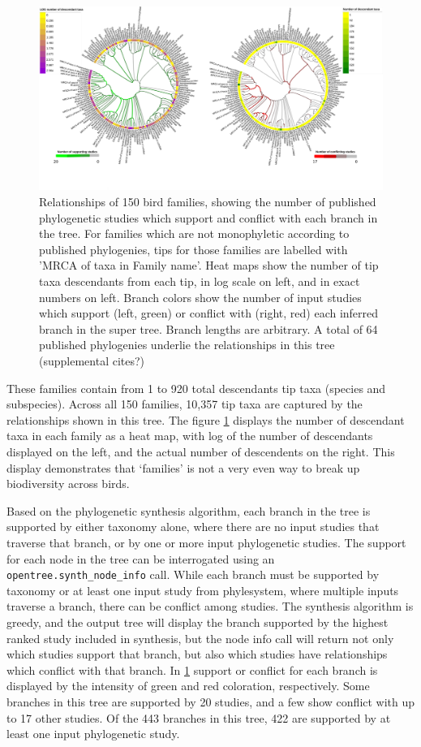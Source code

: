 \documentclass[oupdraft]{sysbio_sse}
\begin{document}
\begin{figure}[!p]
\centering\includegraphics[width=\textwidth]{bird_fam_fig}
\caption{Relationships of 150 bird families, showing the number of published phylogenetic studies which support and conflict with each branch in the tree. For families which are not monophyletic according to published phylogenies, tips for those families are labelled with 'MRCA of taxa in Family name'. Heat maps show the number of tip taxa descendants from each tip, in log scale on left, and in exact numbers on left. Branch colors show the number of input studies which support (left, green) or conflict with (right, red) each inferred branch in the super tree. Branch lengths are arbitrary. A total of 64 published phylogenies underlie the relationships in this tree (supplemental cites?)}
\label{birdfams}
\end{figure}

These families contain from 1 to 920 total descendants tip taxa (species and subspecies).
Across all 150 families, 10,357 tip taxa  are captured by the relationships shown in this tree.
The figure \ref{birdfams} displays the number of descendant taxa in each family as a heat map, with log of the number of descendants displayed on the left, and the actual number of descendents on the right.
This display demonstrates that `families' is not a very even way to break up biodiversity across birds.

Based on the phylogenetic synthesis algorithm, each branch in the tree is supported by either taxonomy alone, where there are no input studies that traverse that branch, or by one or more input phylogenetic studies. 
The support for each node in the tree can be interrogated using an \texttt{opentree.synth\_node\_info} call.
While each branch must be supported by taxonomy or at least one input study from phylesystem, where multiple inputs traverse a branch, there can be conflict among studies.
The synthesis algorithm is greedy, and the output tree will display the branch supported by the highest ranked study included in synthesis, but the node info call will return not only which studies support that branch, but also which studies have relationships which conflict with that branch.
In \ref{birdfams} support or conflict for each branch is displayed by the intensity of green and red coloration, respectively. Some branches in this tree are supported by 20 studies, and a few show conflict with up to 17 other studies. Of the 443 branches in this tree, 422 are supported by at least one input phylogenetic study. 
\end{document}
